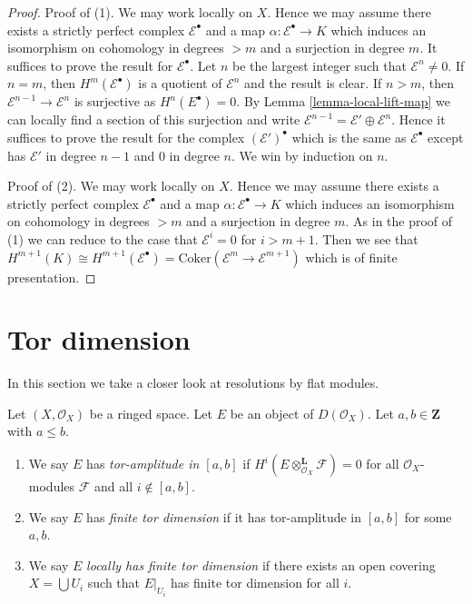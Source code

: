 \begin{proof}
Proof of (1). We may work locally on $X$. Hence we may assume there exists
a strictly perfect complex $\mathcal{E}^\bullet$ and a map
$\alpha : \mathcal{E}^\bullet \to K$ which induces
an isomorphism on cohomology in degrees $> m$ and a surjection in degree $m$.
It suffices to prove the result for $\mathcal{E}^\bullet$.
Let $n$ be the largest integer such that $\mathcal{E}^n \not = 0$.
If $n = m$, then $H^m(\mathcal{E}^\bullet)$ is a quotient of
$\mathcal{E}^n$ and the result is clear.
If $n > m$, then $\mathcal{E}^{n - 1} \to \mathcal{E}^n$ is surjective as
$H^n(E^\bullet) = 0$. By Lemma \ref{lemma-local-lift-map}
we can locally find a section of this surjection and write
$\mathcal{E}^{n - 1} = \mathcal{E}' \oplus \mathcal{E}^n$.
Hence it suffices to prove the result for the complex
$(\mathcal{E}')^\bullet$ which is the same as $\mathcal{E}^\bullet$
except has $\mathcal{E}'$ in degree $n - 1$ and $0$ in degree $n$.
We win by induction on $n$.

\medskip\noindent
Proof of (2). We may work locally on $X$. Hence we may assume there exists
a strictly perfect complex $\mathcal{E}^\bullet$ and a map
$\alpha : \mathcal{E}^\bullet \to K$ which induces
an isomorphism on cohomology in degrees $> m$ and a surjection in degree $m$.
As in the proof of (1) we can reduce to the case that $\mathcal{E}^i = 0$
for $i > m + 1$. Then we see that
$H^{m + 1}(K) \cong H^{m + 1}(\mathcal{E}^\bullet) =
\text{Coker}(\mathcal{E}^m \to \mathcal{E}^{m + 1})$
which is of finite presentation.
\end{proof}





\section{Tor dimension}
\label{section-tor}

\noindent
In this section we take a closer look at resolutions by flat modules.

\begin{definition}
\label{definition-tor-amplitude}
Let $(X, \mathcal{O}_X)$ be a ringed space.
Let $E$ be an object of $D(\mathcal{O}_X)$.
Let $a, b \in \mathbf{Z}$ with $a \leq b$.
\begin{enumerate}
\item We say $E$ has {\it tor-amplitude in $[a, b]$}
if $H^i(E \otimes_{\mathcal{O}_X}^\mathbf{L} \mathcal{F}) = 0$
for all $\mathcal{O}_X$-modules $\mathcal{F}$ and all $i \not \in [a, b]$.
\item We say $E$ has {\it finite tor dimension}
if it has tor-amplitude in $[a, b]$ for some $a, b$.
\item We say $E$ {\it locally has finite tor dimension}
if there exists an open covering $X = \bigcup U_i$ such that
$E|_{U_i}$ has finite tor dimension for all $i$.
\end{enumerate}
\end{definition}

